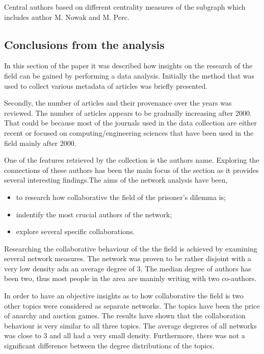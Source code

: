 \documentclass{article}
\begin{document}
\begin{table}[!hbtp]
    \begin{center}
    \scalebox{0.8}{
    
    
    }
    \caption{Central authors based on different centrality measures of the subgraph
    which includes author M. Nowak and M. Perc.}
    \label{table:perc_clique}
    \end{center}
\end{table}

\subsection{Conclusions from the analysis}

In this section of the paper it was described how insights on the research of the
field can be gained by performing a data analysis. Initially the method that
was used to collect various metadata of articles was briefly presented.

Secondly, the number of articles and their provenance over the years was
reviewed. The number of articles appears to be gradually increasing after 2000.
That could be because most of the journals used in the data collection are either
recent or focused on computing/engineering sciences that have been used in the
field mainly after 2000.

One of the features retrieved by the collection is the authors name. Exploring
the connections of these authors has been the main focus of the section as it
provides several interesting findings.The aims of the network analysis have been,

\begin{itemize}
    \item to research how collaborative the field of the prisoner's dilemma is;
    \item indentify the most crucial authors of the network;
    \item explore several specific collaborations.
\end{itemize}

Researching the collaborative behaviour of the the field is achieved by examining
several network measures. The network was proven to be rather disjoint with a
very low density adn an average degree of 3. The median degree of authors has been
two, thus most people in the area are maninly writing with two co-authors.

In order to have an objective insights as to how collaborative the field is
two other topics were considered as separate networks. The topics have been the
price of anarchy and auction games. The results have shown that the collaboration
behaviour is very similar to all three topics. The average degreres of all networks
was close to 3 and all had a very small density. Furthermore, there was not a 
significant difference between the degree distributions of the topics.
\end{document}
